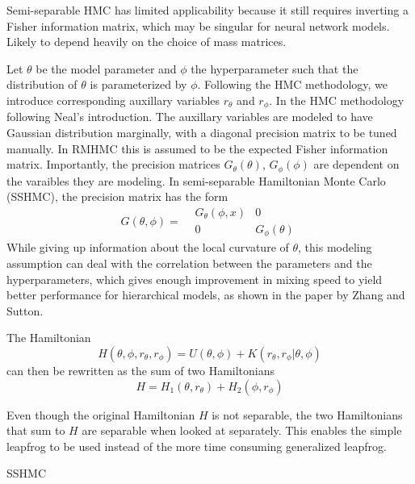\documentclass{book}
\begin{document}
\begin{enumerate}
Semi-separable HMC has limited applicability because it still requires inverting
a Fisher information matrix, which may be singular for neural network models.
Likely to depend heavily on the choice of mass matrices.

Let $\theta$ be the model parameter and $\phi$ the hyperparameter such that
the distribution of $\theta$ is parameterized by $\phi$. Following the HMC
methodology, we introduce corresponding auxillary variables $r_\theta$ and
$r_\phi$. 
In the HMC methodology following Neal's introduction. The auxillary variables
are modeled to have Gaussian distribution marginally, with a diagonal precision
matrix to be tuned manually. In RMHMC this is assumed to be the expected Fisher
information matrix. Importantly, the precision matrices $G_\theta(\theta)$,
$G_\phi(\phi)$
are dependent on the varaibles they are modeling. In semi-separable Hamiltonian
Monte Carlo (SSHMC), the precision matrix has the form
\[ G(\theta,\phi) = 
    \begin{align}
    &G_\theta(\phi,x) & 0 \\
    &0 &G_\phi(\theta)
    \end{align}
\]
While giving up information about the local curvature of $\theta$, this modeling
assumption can deal with the correlation between the parameters and
the hyperparameters, which gives enough improvement in mixing speed to yield
better performance for hierarchical models, as shown in the paper by Zhang and
Sutton. 

The Hamiltonian 
\[H(\theta,\phi,r_\theta,r_\phi) = U(\theta,\phi) + K(r_\theta,
r_\phi|\theta,\phi)\] can then be rewritten as the sum of two Hamiltonians 
\[H = H_1(\theta,r_\theta) + H_2(\phi,r_\phi) \]

Even though the original Hamiltonian $H$ is not separable, the two Hamiltonians that
sum to $H$ are separable when looked at separately. This enables the simple
leapfrog to be used instead of the more time consuming generalized leapfrog.

\begin{algorithm}
    \caption{SSHMC}
    \EndFor
\end{algorithm}

\end{enumerate}
\end{document}
